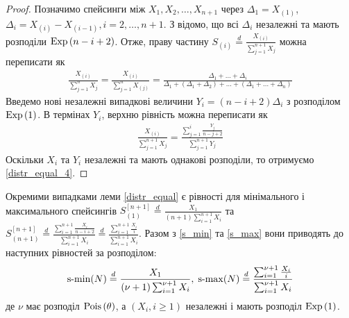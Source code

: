 \begin{proof}
    Позначимо спейсинги між $X_1, X_2, \dots, X_{n+1}$ через
    $\Delta_1 = X_{(1)}$,
    $\Delta_i = X_{(i)} - X_{(i-1)}, i=2, \dots, n+1$. З \cite{Arnold_et_al_2008} відомо, що
    всі $\Delta_i$ незалежні та мають розподіли $\mathrm{Exp}\left(n-i+2\right)$.
    Отже, праву частину $S_{(i)} \overset{d}{=} \frac{X_{(i)}}{\sum_{j=1}^{n+1}X_j}$
    можна переписати як
    \begin{gather*}
        \frac{X_{(i)}}{\sum_{j=1}^{n}X_j} = 
        \frac{X_{(i)}}{\sum_{j=1}^{n}X_{(j)}} = 
        \frac{
            \Delta_1 + \dots + \Delta_i
        }{
            \Delta_1 + \left(\Delta_1 + \Delta_2\right) +
            \dots + \left(\Delta_1 + \dots + \Delta_n\right)
        }
    \end{gather*}
    Введемо нові незалежні випадкові величини
    $Y_i = (n-i+2)\Delta_i$ з розподілом
    $\mathrm{Exp}\left(1\right)$. В термінах $Y_i$,
    верхню рівність можна переписати як
    \begin{gather*}
        \frac{X_{(i)}}{\sum_{j=1}^{n+1}X_j} = 
        \frac{
            \sum_{j=1}^i \frac{Y_j}{n-j+2} 
        }{
            \sum_{j=1}^{n+1} Y_j
        }
    \end{gather*}
    Оскільки $X_i$ та $Y_i$ незалежні та мають однакові розподіли, то отримуємо \eqref{distr_equal_4}.
\end{proof}

Окремими випадками леми \ref{distr_equal}
є рівності для мінімального і максимального спейсингів
$S_{(1)}^{[n+1]} \overset{d}{=} \frac{X_1}{(n+1)\sum_{i=1}^{n+1} X_i}$
та $S_{(n+1)}^{[n+1]} \overset{d}{=} \frac{\sum_{i=1}^{n+1} \frac{X_i}{n-i+2}}{\sum_{i=1}^{n+1} X_i}
\overset{d}{=} \frac{\sum_{i=1}^{n+1} \frac{X_i}{i}}{\sum_{i=1}^{n+1} X_i}$.
Разом з \eqref{s_min} та \eqref{s_max}
вони приводять до наступних рівностей за розподілом:
\begin{gather}\label{distr_equal_5}
    \operatorname{s-min}(N) \overset{d}{=}
    \frac{X_1}{(\nu+1)\sum_{i=1}^{\nu+1} X_i} , \;
    \operatorname{s-max}(N) \overset{d}{=} 
    \frac{\sum_{i=1}^{\nu+1} \frac{X_i}{i}}{\sum_{i=1}^{\nu+1} X_i}
\end{gather}
де $\nu$ має розподіл $\mathrm{Pois}\left(\theta\right)$, а $\left(X_i, i\geq 1\right)$ незалежні і мають розподіл $\mathrm{Exp}\left(1\right)$.

